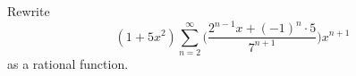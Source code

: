 Rewrite
\[
(1 + 5x^2) \sum_{n=2}^\infty \biggl( \frac{2^{n-1}x + (-1)^n \cdot 5}{7^{n+1}}  \biggr) x^{n+1}
\]
as a rational function.
